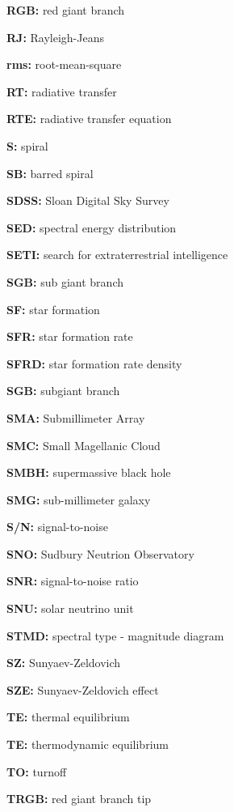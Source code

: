 \documentclass[a4paper,10pt]{article}
\begin{document}
{\noindent}\textbf{RGB:} red giant branch

{\noindent}\textbf{RJ:} Rayleigh-Jeans

{\noindent}\textbf{rms:} root-mean-square

{\noindent}\textbf{RT:} radiative transfer

{\noindent}\textbf{RTE:} radiative transfer equation

{\noindent}\textbf{S:} spiral

{\noindent}\textbf{SB:} barred spiral

{\noindent}\textbf{SDSS:} Sloan Digital Sky Survey

{\noindent}\textbf{SED:} spectral energy distribution

{\noindent}\textbf{SETI:} search for extraterrestrial intelligence

{\noindent}\textbf{SGB:} sub giant branch

{\noindent}\textbf{SF:} star formation

{\noindent}\textbf{SFR:} star formation rate

{\noindent}\textbf{SFRD:} star formation rate density

{\noindent}\textbf{SGB:} subgiant branch

{\noindent}\textbf{SMA:} Submillimeter Array

{\noindent}\textbf{SMC:} Small Magellanic Cloud

{\noindent}\textbf{SMBH:} supermassive black hole

{\noindent}\textbf{SMG:} sub-millimeter galaxy

{\noindent}\textbf{S/N:} signal-to-noise

{\noindent}\textbf{SNO:} Sudbury Neutrion Observatory

{\noindent}\textbf{SNR:} signal-to-noise ratio

{\noindent}\textbf{SNU:} solar neutrino unit

{\noindent}\textbf{STMD:} spectral type - magnitude diagram

{\noindent}\textbf{SZ:} Sunyaev-Zeldovich

{\noindent}\textbf{SZE:} Sunyaev-Zeldovich effect

{\noindent}\textbf{TE:} thermal equilibrium

{\noindent}\textbf{TE:} thermodynamic equilibrium

{\noindent}\textbf{TO:} turnoff

{\noindent}\textbf{TRGB:} red giant branch tip
\end{document}
